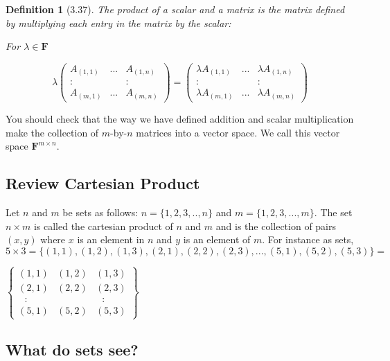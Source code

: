 \documentclass{article}
\theoremstyle{problemstyle}
\newtheorem{definition}{Definition}
\begin{document}
\begin{definition}[3.37]
The product of a scalar and a matrix is the matrix defined by multiplying each entry in the matrix by the scalar:

For $\lambda \in \textbf{F}$

\begin{equation}
\lambda\begin{pmatrix} A_{(1,1)} & ... & A_{(1,n)} \\ : &  & : \\ A_{(m,1)} & ... & A_{(m,n)} \end{pmatrix} = \begin{pmatrix} \lambda A_{(1,1)} & ... & \lambda A_{(1,n)} \\ : &  & : \\ \lambda A_{(m,1)} & ... & \lambda A_{(m,n)} \end{pmatrix}
\end{equation}

\end{definition}

You should check that the way we have defined addition and scalar multiplication make the collection of $m$-by-$n$ matrices into a vector space. We call this vector space $\textbf{F}^{m\times n}$.

\subsection*{Review Cartesian Product}

Let $n$ and $m$ be sets as follows:  $n = \{1,2,3,..,n\}$ and $m  = \{1,2,3,..., m\}$. The set $n \times m$ is called the cartesian product of $n$ and $m$ and is the collection of pairs $(x,y)$ where $x$ is an element in $n$ and $y$ is an element of $m$.  For instance as sets, $5 \times 3 = \{(1,1), (1,2), (1,3), (2,1),(2,2),(2,3),...,(5,1),(5,2),(5,3)\} = $

\begin{center}
$\left\{ \begin{array}{lll}
         (1,1) & (1,2) & (1,3)\\
         (2,1) & (2,2) & (2,3)\\
        \ \ \  :  &    \      & \ \ \  :  \\
        (5,1) & (5,2) & (5,3)\end{array} \right \}$
\end{center}

\subsection*{What do sets see?}
\end{document}
